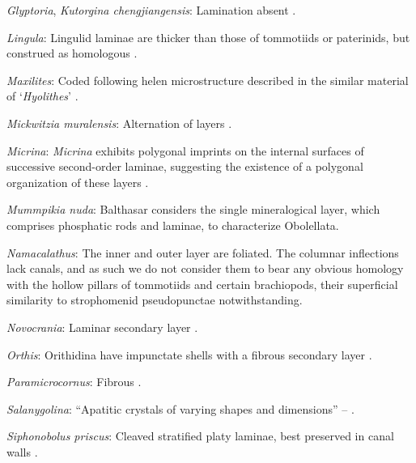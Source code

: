 \documentclass[openany]{book}
\begin{document}
\hypertarget{Glyptoria-coding-133}{}
\emph{Glyptoria}, \emph{Kutorgina chengjiangensis}: Lamination absent
\citep[following][appendix 2]{Williams1998Thediversity}.

\hypertarget{Lingula-coding-133}{}
\emph{Lingula}: Lingulid laminae are thicker than those of tommotiids or
paterinids, but construed as homologous
\citep{Balthasar2009Homologousskeletal}.

\hypertarget{Maxilites-coding-133}{}
\emph{Maxilites}: Coded following helen microstructure described in the
similar material of `\emph{Hyolithes}' \citep{MartiMus2007}.

\hypertarget{Mickwitzia_muralensis-coding-133}{}
\emph{Mickwitzia muralensis}: Alternation of layers
\citep{Balthasar2004Shellstructure}.

\hypertarget{Micrina-coding-133}{}
\emph{Micrina}: \emph{Micrina} exhibits polygonal imprints on the
internal surfaces of successive second-order laminae, suggesting the
existence of a polygonal organization of these layers
\citep{Balthasar2009Homologousskeletal}.

\hypertarget{Mummpikia_nuda-coding-133}{}
\emph{Mummpikia nuda}: Balthasar \citeyearpar{Balthasar2008iMummpikia}
considers the single mineralogical layer, which comprises phosphatic
rods and laminae, to characterize Obolellata.

\hypertarget{Namacalathus-coding-133}{}
\emph{Namacalathus}: The inner and outer layer are foliated. The
columnar inflections lack canals, and as such we do not consider them to
bear any obvious homology with the hollow pillars of tommotiids and
certain brachiopods, their superficial similarity to strophomenid
pseudopunctae notwithstanding.

\hypertarget{Novocrania-coding-133}{}
\emph{Novocrania}: Laminar secondary layer \citep{Parkinson2005}.

\hypertarget{Orthis-coding-133}{}
\emph{Orthis}: Orithidina have impunctate shells with a fibrous
secondary layer \citep[p.~724]{Williams2000LinguliformeaCraniiformea}.

\hypertarget{Paramicrocornus-coding-133}{}
\emph{Paramicrocornus}: Fibrous \citep{Zhang2018Ahyolithid}.

\hypertarget{Salanygolina-coding-133}{}
\emph{Salanygolina}: ``Apatitic crystals of varying shapes and
dimensions'' -- \citet{Holmer2009Theenigmatic}.

\hypertarget{Siphonobolus_priscus-coding-133}{}
\emph{Siphonobolus priscus}: Cleaved stratified platy laminae, best
preserved in canal walls \citep{Williams2004Chemicostructure}.
\end{document}
